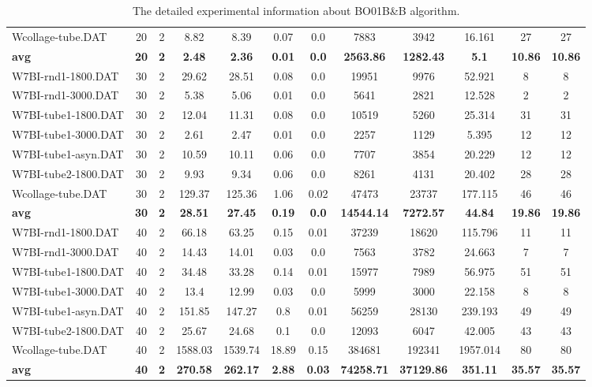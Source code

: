 \begin{table}[!h]
{\begin{tabular}{lccccccccccc}
Wcollage-tube.DAT & 20 & 2 & 8.82 & 8.39 & 0.07 & 0.0 & 7883 & 3942 & 16.161 & 27 & 27\\
\cline{1-12} \textbf{avg} & \textbf{20} & \textbf{2} & \textbf{2.48} & \textbf{2.36} & \textbf{0.01} & \textbf{0.0} & \textbf{2563.86} & \textbf{1282.43} & \textbf{5.1} & \textbf{10.86} & \textbf{10.86} \\ \cline{1-12}
W7BI-rnd1-1800.DAT & 30 & 2 & 29.62 & 28.51 & 0.08 & 0.0 & 19951 & 9976 & 52.921 & 8 & 8\\
W7BI-rnd1-3000.DAT & 30 & 2 & 5.38 & 5.06 & 0.01 & 0.0 & 5641 & 2821 & 12.528 & 2 & 2\\
W7BI-tube1-1800.DAT & 30 & 2 & 12.04 & 11.31 & 0.08 & 0.0 & 10519 & 5260 & 25.314 & 31 & 31\\
W7BI-tube1-3000.DAT & 30 & 2 & 2.61 & 2.47 & 0.01 & 0.0 & 2257 & 1129 & 5.395 & 12 & 12\\
W7BI-tube1-asyn.DAT & 30 & 2 & 10.59 & 10.11 & 0.06 & 0.0 & 7707 & 3854 & 20.229 & 12 & 12\\
W7BI-tube2-1800.DAT & 30 & 2 & 9.93 & 9.34 & 0.06 & 0.0 & 8261 & 4131 & 20.402 & 28 & 28\\
Wcollage-tube.DAT & 30 & 2 & 129.37 & 125.36 & 1.06 & 0.02 & 47473 & 23737 & 177.115 & 46 & 46\\
\cline{1-12} \textbf{avg} & \textbf{30} & \textbf{2} & \textbf{28.51} & \textbf{27.45} & \textbf{0.19} & \textbf{0.0} & \textbf{14544.14} & \textbf{7272.57} & \textbf{44.84} & \textbf{19.86} & \textbf{19.86} \\ \cline{1-12}
W7BI-rnd1-1800.DAT & 40 & 2 & 66.18 & 63.25 & 0.15 & 0.01 & 37239 & 18620 & 115.796 & 11 & 11\\
W7BI-rnd1-3000.DAT & 40 & 2 & 14.43 & 14.01 & 0.03 & 0.0 & 7563 & 3782 & 24.663 & 7 & 7\\
W7BI-tube1-1800.DAT & 40 & 2 & 34.48 & 33.28 & 0.14 & 0.01 & 15977 & 7989 & 56.975 & 51 & 51\\
W7BI-tube1-3000.DAT & 40 & 2 & 13.4 & 12.99 & 0.03 & 0.0 & 5999 & 3000 & 22.158 & 8 & 8\\
W7BI-tube1-asyn.DAT & 40 & 2 & 151.85 & 147.27 & 0.8 & 0.01 & 56259 & 28130 & 239.193 & 49 & 49\\
W7BI-tube2-1800.DAT & 40 & 2 & 25.67 & 24.68 & 0.1 & 0.0 & 12093 & 6047 & 42.005 & 43 & 43\\
Wcollage-tube.DAT & 40 & 2 & 1588.03 & 1539.74 & 18.89 & 0.15 & 384681 & 192341 & 1957.014 & 80 & 80\\
\cline{1-12} \textbf{avg} & \textbf{40} & \textbf{2} & \textbf{270.58} & \textbf{262.17} & \textbf{2.88} & \textbf{0.03} & \textbf{74258.71} & \textbf{37129.86} & \textbf{351.11} & \textbf{35.57} & \textbf{35.57} \\ \cline{1-12}
\bottomrule
\end{tabular}%
}%
\caption{The detailed experimental information about BO01B\&B algorithm.}
\label{tab:table_bb}
\end{table}

